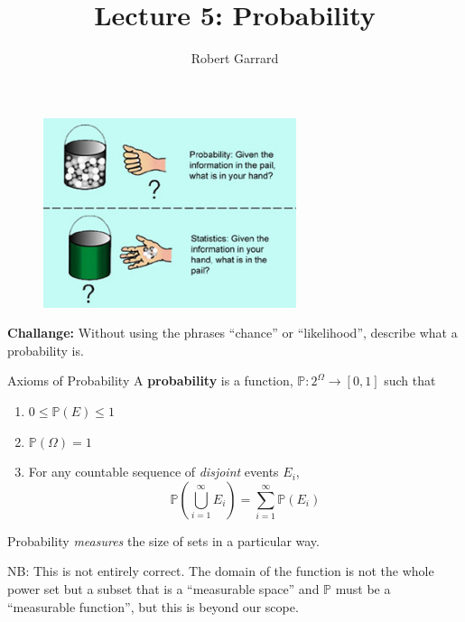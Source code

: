 \documentclass[11pt, xcolor={dvipsnames}, hyperref={colorlinks, allcolors=Blue}]{beamer}
\title[ECON 8000 -  Lecture 5]{Lecture 5: Probability}
\author[University of Queensland]{Robert Garrard}
\date[\today]{}
\renewcommand{\P}{\mathbb{P}}
\begin{document}
\begin{frame}
\titlepage


\end{frame}

\begin{frame}
\begin{figure}
	\centering
	\includegraphics[width=0.66\textwidth]{prob_stats}
\end{figure}

\vfill
\textbf{Challange:} Without using the phrases ``chance'' or ``likelihood'', describe what a probability is.
\end{frame}

\begin{frame}{Axioms of Probability}
A \textbf{probability} is a function, $\P : 2^{\Omega} \to [0, 1]$ such that
\begin{enumerate}[1.]
\item $0 \leq \P(E) \leq 1$
\item $\P (\Omega) = 1$
\item For any countable sequence of \emph{disjoint} events $E_{i}$,
\[\P\left (\bigcup_{i=1}^{\infty} E_{i} \right) = \sum_{i=1}^{\infty} \P(E_{i}) \]
\end{enumerate}
\vfill

Probability \emph{measures} the size of sets in a particular way.

\vfill
\small
NB: This is not entirely correct. The domain of the function is not the whole power set but a subset that is a ``measurable space'' and $\P$ must be a ``measurable function'', but this is beyond our scope.
\end{frame}
\end{document}
